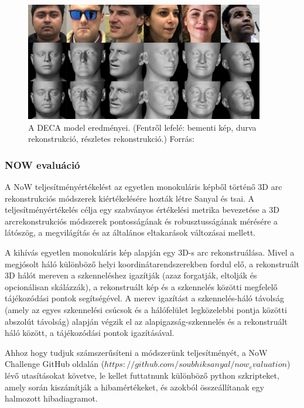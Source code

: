 \documentclass[12pt,a4]{article}
\begin{document}
             \begin{figure}[h]	
    		      \centering
    		      \includegraphics[width=1\linewidth]{deca_results2.png}
                \caption{A DECA model eredményei. (Fentről lefelé: bementi kép, durva rekonstrukció, részletes rekonstrukció.) Forrás: \cite{deca}}
                \label{fig:humanfacerecmatrix}
    	       \end{figure} 
            
            \clearpage
            \subsubsection{NOW evaluáció}

            A NoW teljesítményértékelést az egyetlen monokuláris képből történő 3D arc rekonstrukciós módszerek kiértékelésére hozták létre \cite{now}Sanyal és tsai. A teljesítményértékelés célja egy szabványos értékelési metrika bevezetése a 3D arcrekonstrukciós módszerek pontosságának és robusztusságának mérésére a látószög, a megvilágítás és az általános eltakarások változásai mellett.

            A kihívás egyetlen monokuláris kép alapján egy 3D-s arc rekonstruálása. Mivel a megjósolt háló különböző helyi koordinátarendszerekben fordul elő, a rekonstruált 3D hálót mereven a szkenneléshez igazítják (azaz forgatják, eltolják és opcionálisan skálázzák), a rekonstruált kép és a szkennelés közötti megfelelő tájékozódási pontok segítségével. A merev igazítást a szkennelés-háló távolság (amely az egyes szkennelési csúcsok és a hálófelület legközelebbi pontja közötti abszolút távolság) alapján végzik el az alapigazság-szkennelés és a rekonstruált háló között, a tájékozódási pontok igazításával.

            Ahhoz hogy tudjuk számszerűsíteni a módszerünk teljesítményét, a NoW Challenge GitHub oldalán ($https://github.com/soubhiksanyal/now_evaluation$) lévő utasításokat követve, le kellet futtatnunk különböző python szkripteket, amely során kiszámítják a hibamértékeket, és azokból összeállítanak egy halmozott hibadiagramot.
            
\end{document}
